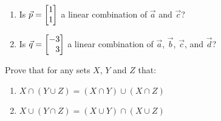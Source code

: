 \begin{exercises}
\begin{problist}
\begin{enumerate}
			\item Is $\vec p=\mat{1\\1}$ a linear combination of $\vec a$ and $\vec c$?
			\item Is $\vec q=\mat{-3\\3}$ a linear combination of $\vec a$, $\vec b$, $\vec c$, and $\vec d$?
		\end{enumerate}
		\prob
			Prove that for any sets $X$, $Y$ and $Z$ that:
			\begin{enumerate}
				\item $X \cap (Y \cup Z) = (X\cap Y) \cup (X\cap Z)$
				\item $X \cup (Y \cap Z) = (X\cup Y) \cap (X\cup Z)$
			\end{enumerate}
	\end{problist}
\end{exercises}
